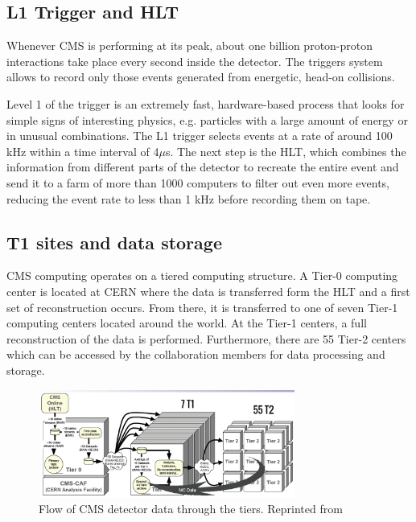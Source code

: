 \subsection{L1 Trigger and HLT}
 Whenever CMS is performing at its peak, about one billion proton-proton interactions take place every second inside the detector. The triggers system allows to record only those events generated from energetic, head-on collisions.

Level 1 of the trigger is an extremely fast, hardware-based process that looks for simple signs of interesting physics, e.g. particles with a large amount of energy or in unusual combinations. The L1 trigger selects events at a rate of around 100 kHz within a time interval of 4$\mu$s. The next step is the HLT, which combines the information from different parts of the detector to recreate the entire event and send it to a farm of more than 1000 computers to filter out even more events, reducing the event rate to less than 1 kHz before recording them on tape.

\subsection{T1 sites and data storage}

CMS computing operates on a tiered computing structure. A Tier-0 computing center is located at CERN where the data is transferred form the HLT and a first set of reconstruction occurs. From there, it is transferred to one of seven Tier-1 computing centers located around the world. At the Tier-1 centers, a full reconstruction of the data is performed. Furthermore, there are 55 Tier-2 centers which can be accessed by the collaboration members for data processing and storage.

 \begin{figure}[H]
 	\centering
 	\includegraphics[width=0.75\textwidth]{figures/dataflowtiers_MC.png}
 	\singlespace
 	\caption{Flow of CMS detector data through the tiers. Reprinted from \cite{CMSdatatier}}
 	\label{fig:datatier}
 \end{figure}


